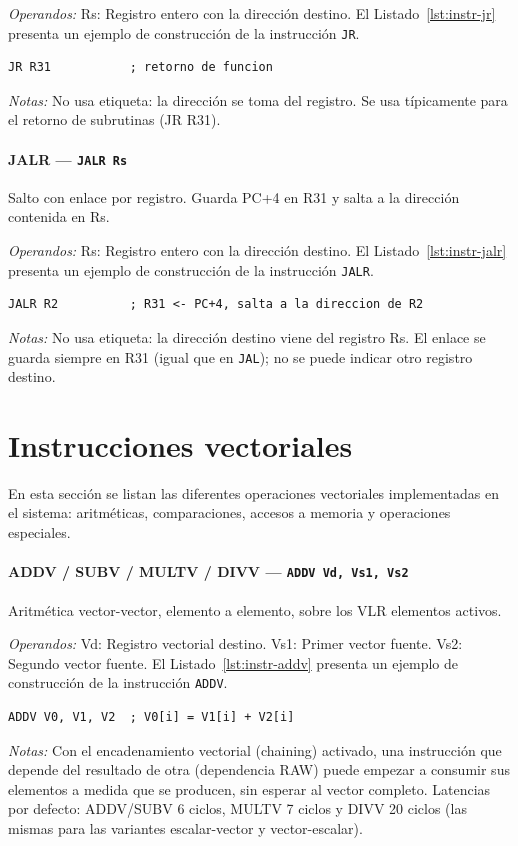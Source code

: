 \documentclass[../main.tex]{subfiles}
\begin{document}
\textit{Operandos:} Rs: Registro entero con la dirección destino.
El Listado~\ref{lst:instr-jr} presenta un ejemplo de construcción de la instrucción \texttt{JR}.

\begin{lstlisting}[caption={JR},label={lst:instr-jr}]
	JR R31           ; retorno de funcion
\end{lstlisting}
\textit{Notas:} No usa etiqueta: la dirección se toma del registro. Se usa típicamente para el retorno de subrutinas (JR R31).

\paragraph*{JALR --- \texttt{JALR Rs}}
Salto con enlace por registro. Guarda PC+4 en R31 y salta a la dirección contenida en Rs.

\textit{Operandos:} Rs: Registro entero con la dirección destino.
El Listado~\ref{lst:instr-jalr} presenta un ejemplo de construcción de la instrucción \texttt{JALR}.

\begin{lstlisting}[caption={JALR},label={lst:instr-jalr}]
	JALR R2          ; R31 <- PC+4, salta a la direccion de R2
\end{lstlisting}
\textit{Notas:} No usa etiqueta: la dirección destino viene del registro Rs. El enlace se guarda siempre en R31 (igual que en \texttt{JAL}); no se puede indicar otro registro destino.

\section{Instrucciones vectoriales}

En esta sección se listan las diferentes operaciones vectoriales implementadas en el sistema: aritméticas, comparaciones, accesos a memoria y operaciones especiales.

\paragraph*{ADDV / SUBV / MULTV / DIVV --- \texttt{ADDV Vd, Vs1, Vs2}}
Aritmética vector-vector, elemento a elemento, sobre los VLR elementos activos.

\textit{Operandos:} Vd: Registro vectorial destino. Vs1: Primer vector fuente. Vs2: Segundo vector fuente.
El Listado~\ref{lst:instr-addv} presenta un ejemplo de construcción de la instrucción \texttt{ADDV}.

\begin{lstlisting}[caption={ADDV},label={lst:instr-addv}]
	ADDV V0, V1, V2  ; V0[i] = V1[i] + V2[i]
\end{lstlisting}
\textit{Notas:} Con el encadenamiento vectorial (chaining) activado, una instrucción que depende del resultado de otra (dependencia RAW) puede empezar a consumir sus elementos a medida que se producen, sin esperar al vector completo. Latencias por defecto: ADDV/SUBV 6 ciclos, MULTV 7 ciclos y DIVV 20 ciclos (las mismas para las variantes escalar-vector y vector-escalar).
\end{document}
